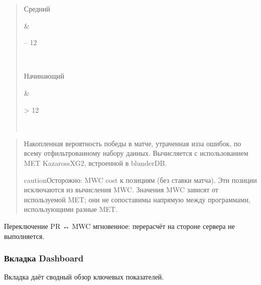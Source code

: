 \documentclass[letterpaper,10pt,russian]{sphinxmanual}
\begin{document}
\begin{quote}
\begin{savenotes}
\begin{tabular}[t]{}
\begin{varwidth}[t]{}
\sphinxAtStartPar
Средний
\sphinxbeforeendvarwidth
\end{varwidth}%
&\begin{varwidth}[t]{}
 – 12
\sphinxbeforeendvarwidth
\end{varwidth}%
\\
\sphinxhline\begin{varwidth}[t]{}
\sphinxAtStartPar
Начинающий
\sphinxbeforeendvarwidth
\end{varwidth}%
&\begin{varwidth}[t]{}
\sphinxAtStartPar
> 12
\sphinxbeforeendvarwidth
\end{varwidth}%
\\
\sphinxbottomrule
\end{tabular}
\sphinxtableafterendhook\par
\sphinxattableend\end{savenotes}
\end{quote}

\sphinxAtStartPar
{}
\begin{quote}

\sphinxAtStartPar
Накопленная вероятность победы в матче, утраченная из\sphinxhyphen{}за ошибок, по всему отфильтрованному набору данных. Вычисляется с использованием MET Kazaross\sphinxhyphen{}XG2, встроенной в blunderDB.

\begin{sphinxadmonition}{caution}{Осторожно:}
\sphinxAtStartPar
MWC cost  к позициям  (без ставки матча). Эти позиции исключаются из вычисления MWC. Значения MWC зависят от используемой MET; они не сопоставимы напрямую между программами, использующими разные MET.
\end{sphinxadmonition}
\end{quote}

\sphinxAtStartPar
Переключение PR ↔ MWC мгновенное: перерасчёт на стороне сервера не выполняется.


\subsubsection{Вкладка Dashboard}
\label{\detokenize{manuel:onglet-dashboard}}
\sphinxAtStartPar
Вкладка  даёт сводный обзор ключевых показателей.
\end{document}
